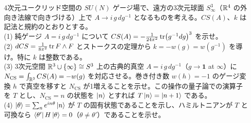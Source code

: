 \begin{problem}[難易度 B]\label{ch03-prob-theta}
4次元ユークリッド空間の $SU(N)$ ゲージ場で、遠方の3次元球面 $S^3_\infty$（$\mathbb{R}^4$ の外向き法線で向きづける）上で $A\to i\,g\,dg^{-1}$ となるものを考える。$CS(A)$、$k$ は記法と規約のとおりとする。\\
(1) 純ゲージ $A=i\,g\,dg^{-1}$ について $CS(A)=-\frac{1}{24\pi^2}\tr(g^{-1}dg)^3$ を示せ。\\
(2) $dCS=\frac{1}{8\pi^2}\tr F\wedge F$ とストークスの定理から $k=-w(g)=w(g^{-1})$ を導け。特に $k$ は整数である。\\
(3) 3次元空間 $\mathbb{R}^3\cup\{\infty\}\cong S^3$ 上の古典的真空 $A=i\,g\,dg^{-1}$（$g\to\mathbf 1$ at $\infty$）に $N_{\mathrm{CS}}=\int_{\mathbb{R}^3}CS(A)=-w(g)$ を対応させる。巻き付き数 $w(h)=-1$ のゲージ変換 $h$ で真空を移すと $N_{\mathrm{CS}}$ が1増えることを示せ。この操作の量子論での演算子を $T$ とし、$N_{\mathrm{CS}}=n$ の状態を $\ket{n}$ とすれば $T\ket n=\ket{n+1}$ である。\\
(4) $\ket\theta=\sum_ne^{in\theta}\ket n$ が $T$ の固有状態であることを示し、ハミルトニアンが $T$ と可換なら $\bra{\theta'}H\ket\theta=0$（$\theta\neq\theta'$）であることを示せ。
\end{problem}

